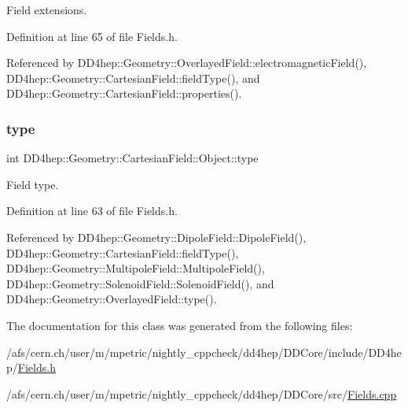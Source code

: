 Field extensions. 



Definition at line 65 of file Fields.\+h.



Referenced by D\+D4hep\+::\+Geometry\+::\+Overlayed\+Field\+::electromagnetic\+Field(), D\+D4hep\+::\+Geometry\+::\+Cartesian\+Field\+::field\+Type(), and D\+D4hep\+::\+Geometry\+::\+Cartesian\+Field\+::properties().

\hypertarget{class_d_d4hep_1_1_geometry_1_1_cartesian_field_1_1_object_a661abde32b68651dc0542aabbe9e448c}{}\label{class_d_d4hep_1_1_geometry_1_1_cartesian_field_1_1_object_a661abde32b68651dc0542aabbe9e448c} 
\subsubsection{\texorpdfstring{type}{type}}
{\footnotesize\ttfamily int D\+D4hep\+::\+Geometry\+::\+Cartesian\+Field\+::\+Object\+::type}



Field type. 



Definition at line 63 of file Fields.\+h.



Referenced by D\+D4hep\+::\+Geometry\+::\+Dipole\+Field\+::\+Dipole\+Field(), D\+D4hep\+::\+Geometry\+::\+Cartesian\+Field\+::field\+Type(), D\+D4hep\+::\+Geometry\+::\+Multipole\+Field\+::\+Multipole\+Field(), D\+D4hep\+::\+Geometry\+::\+Solenoid\+Field\+::\+Solenoid\+Field(), and D\+D4hep\+::\+Geometry\+::\+Overlayed\+Field\+::type().



The documentation for this class was generated from the following files\+:\begin{DoxyCompactItemize}
\item 
/afs/cern.\+ch/user/m/mpetric/nightly\+\_\+cppcheck/dd4hep/\+D\+D\+Core/include/\+D\+D4hep/\hyperlink{_fields_8h}{Fields.\+h}\item 
/afs/cern.\+ch/user/m/mpetric/nightly\+\_\+cppcheck/dd4hep/\+D\+D\+Core/src/\hyperlink{_fields_8cpp}{Fields.\+cpp}\end{DoxyCompactItemize}
